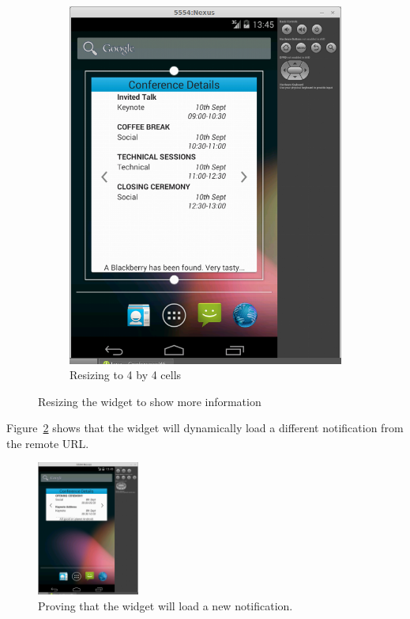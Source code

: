 \documentclass[11pt, a4paper]{article}
\begin{document}
\begin{figure}[h]
\begin{subfigure}[b]{0.3\textwidth}
\includegraphics[width=\textwidth]{img/resizing-4x4}
\caption{Resizing to 4 by 4 cells}
\end{subfigure}
\caption{Resizing the widget to show more information}
\label{fig:resize}
\end{figure}

Figure~\ref{fig:notification} shows that the widget will dynamically load a 
different notification from the remote URL.

\begin{figure}[h]
\centering
\includegraphics[width=0.3\textwidth]{img/new-notification}
\caption{Proving that the widget will load a new notification.}
\label{fig:notification}
\end{figure}
\end{document}

